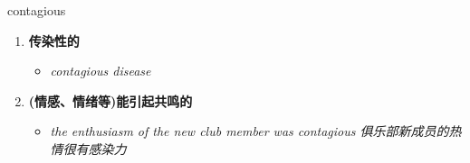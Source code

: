 
\begin{frame}
{\huge contagious}
\begin{center}
\begin{enumerate}\Large
  \item \textbf{传染性的}
  \begin{itemize}
    \item \em{\Large{contagious disease}}
  \end{itemize}
  \item \textbf{(情感、情绪等)能引起共鸣的}
  \begin{itemize}
    \item \em{\Large{the enthusiasm of the new club member was contagious 俱乐部新成员的热情很有感染力}}
  \end{itemize}
\end{enumerate}
\end{center}
\end{frame}
